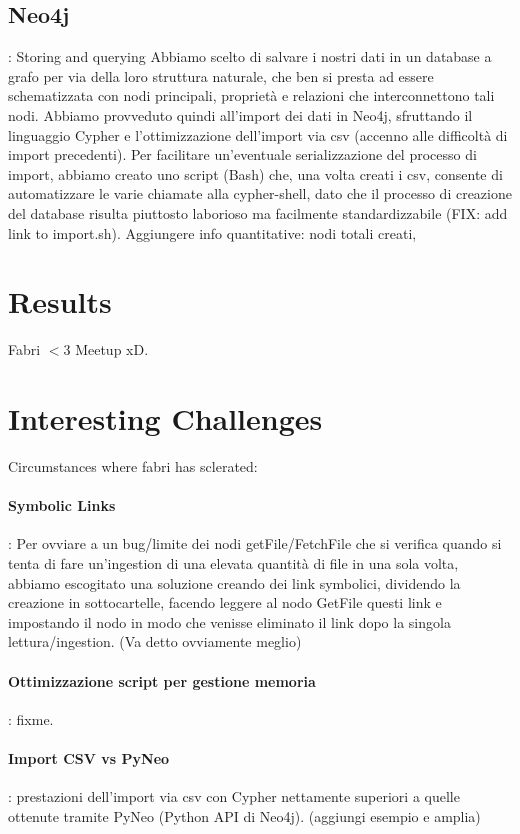 \documentclass[fleqn,10pt]{SelfArx} %
\begin{document}
\subsection{Neo4j}: Storing and querying
Abbiamo scelto di salvare i nostri dati in un database a grafo per via della loro struttura naturale, che ben si presta ad essere schematizzata con nodi principali, proprietà e relazioni che interconnettono tali nodi. Abbiamo provveduto quindi all'import dei dati in Neo4j, sfruttando il linguaggio Cypher e l'ottimizzazione dell'import via csv (accenno alle difficoltà di import precedenti). Per facilitare un'eventuale serializzazione del processo di import, abbiamo creato uno script (Bash) che, una volta creati i csv, consente di automatizzare le varie chiamate alla cypher-shell, dato che il processo di creazione del database risulta piuttosto laborioso ma facilmente standardizzabile (FIX: add link to import.sh).
Aggiungere info quantitative: nodi totali creati, 
\section{Results}

Fabri  $<$3 Meetup xD.
\section*{Interesting Challenges}
Circumstances where fabri has sclerated:
\paragraph{Symbolic Links}: Per ovviare a un bug/limite dei nodi getFile/FetchFile che si verifica quando si tenta di fare un'ingestion di una elevata quantità di file in una sola volta, abbiamo escogitato una soluzione creando dei link symbolici, dividendo la creazione in sottocartelle, facendo leggere al nodo GetFile questi link e impostando il nodo in modo che venisse eliminato il link dopo la singola lettura/ingestion. (Va detto ovviamente meglio)
\paragraph{Ottimizzazione script per gestione memoria}: fixme.
\paragraph{Import CSV vs PyNeo}: prestazioni dell'import via csv con Cypher nettamente superiori a quelle ottenute tramite PyNeo (Python API di Neo4j). (aggiungi esempio e amplia)
\end{document}
